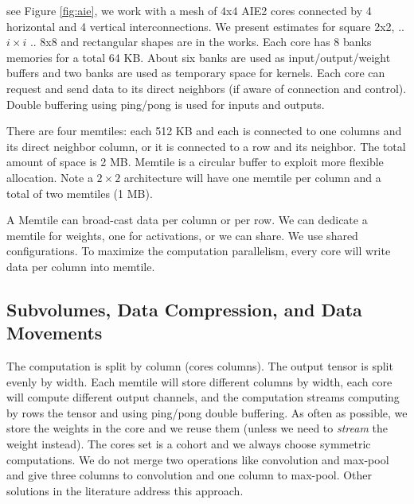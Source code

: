 \documentclass[sigconf]{acmart}
\begin{document}

see Figure \ref{fig:aie}, we work with a mesh of 4x4 AIE2 cores
connected by 4 horizontal and 4 vertical interconnections.  We present
estimates for square 2x2, .. $i\times i$ .. 8x8 and rectangular shapes
are in the works. Each core has 8 banks memories for a total 64
KB. About six banks are used as input/output/weight buffers and two
banks are used as temporary space for kernels. Each core can request
and send data to its direct neighbors (if aware of connection and
control). Double buffering using ping/pong is used for inputs and
outputs.

There are four memtiles: each 512 KB and each is connected to one
columns and its direct neighbor column, or it is connected to a row
and its neighbor. The total amount of space is 2 MB. Memtile is a
circular buffer to exploit more flexible allocation. Note a $2 \times
2$ architecture will have one memtile per column and a total of two
memtiles (1 MB).

A Memtile can broad-cast data per column or per row. We can dedicate a
memtile for weights, one for activations, or we can share. We use
shared configurations. To maximize the computation parallelism, every
core will write data per column into memtile.
\begin{comment}
The DDR is connected with two channels to write into each memtile and
each memtile can use two channels to write into DDR. DDR and memtile
communications are parallel.  The abstraction can be extended to more
complex connections (from $1\times 1$, $8\times 2$, to $8\times 8$ and
more rows of memtiles designed for larger chips). But $4\times 4$ is
representative for the AIE engines you will find in the next
generation of CPU+FPGA chips.
\end{comment}


\subsection{Subvolumes, Data Compression, and Data Movements}
The computation is split by column (cores columns). The output tensor
is split evenly by width. Each memtile will store different columns by
width, each core will compute different output channels, and the
computation streams computing by rows the tensor and using ping/pong
double buffering. As often as possible, we store the weights in the
core and we reuse them (unless we need to {\em stream} the weight
instead). The cores set is a cohort and we always choose symmetric
computations. We do not merge two operations like convolution and
max-pool and give three columns to convolution and one column to
max-pool. Other solutions in the literature address this approach.
\end{document}
